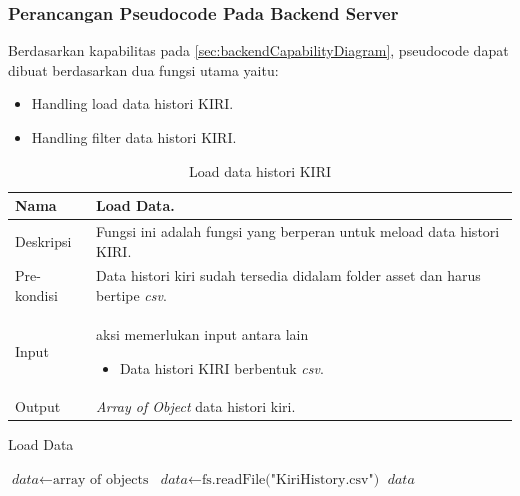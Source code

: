 \subsubsection{Perancangan Pseudocode Pada Backend Server}
Berdasarkan kapabilitas pada \ref{sec:backendCapabilityDiagram}, pseudocode dapat dibuat berdasarkan dua fungsi utama yaitu:
\begin{itemize}
    \item Handling load data histori KIRI.
    \item Handling filter data histori KIRI.
\end{itemize}

\begin{table}[H]
    \centering
       \caption{Load data histori KIRI}
    \begin{tabular}{|p{3cm}|p{10cm}|}
    \hline
        Nama & Load Data.\\
    \hline
    \hline
        Deskripsi & Fungsi ini adalah fungsi yang berperan untuk meload data histori KIRI.
        \\
    \hline
        Pre-kondisi & Data histori kiri sudah tersedia didalam folder asset dan harus bertipe \textit{csv}.\\
    \hline
        Input & 
        aksi memerlukan input antara lain 
        \begin{itemize}
            \item Data histori KIRI berbentuk \textit{csv}.
        \end{itemize}
       \\
       \hline
        Output & 
        \textit{Array of Object} data histori kiri.
       \\
    \hline
    \end{tabular}
\end{table}

\begin{algorithm}[htbp]
\caption{Load Data}
\begin{algorithmic}[1]
\State $\textit{data} \gets \text{array of objects}$
\State $\textit{data} \gets \text{fs.readFile("KiriHistory.csv")}$
\State \Return $\textit{data}$
\EndIf
\EndFunction
\end{algorithmic}
\end{algorithm}


